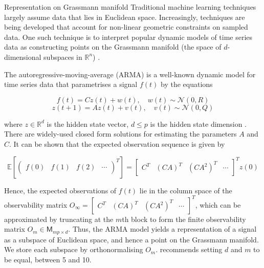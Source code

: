 \documentclass[final]{beamer}
\newlength{\onecolwid}
\begin{document}
\begin{frame}[t]
\begin{columns}[t]
\begin{column}{\onecolwid} %


\begin{block}{Representation on Grassmann manifold}
    Traditional machine learning techniques largely assume data that lies in Euclidean space.
    Increasingly, techniques are being developed that account for non-linear geometric constraints
    on sampled data. One such technique is to interpret popular dynamic models of time series data
    as constructing points on the Grassmann manifold (the space of $d$-dimensional subspaces in
    $\mathbb{R}^n$) \cite{turaga_statistical_2011}.

    The autoregressive-moving-average (ARMA) is a well-known dynamic model for time series data that
    parametrises a signal $f(t)$ by the equations

    \begin{equation}
        f(t) = Cz(t) + w(t), \quad w(t) \sim \mathcal{N}(0, R)
    \end{equation}
    \begin{equation}
        z(t + 1) = Az(t) + v(t), \quad v(t) \sim \mathcal{N}(0, Q)
    \end{equation}

    where $z \in \mathbb{R}^d$ is the hidden state vector, $d \leq p$ is the hidden state dimension
    \cite{turaga_statistical_2011}. There are widely-used closed form solutions for estimating the
    parameters $A$ and $C$. It can be shown that the expected observation sequence is given by

    \begin{equation}\label{eq:observation}
        \mathbb{E}[\begin{pmatrix} f(0) & f(1) & f(2) & \cdots \end{pmatrix}^T]
            = \begin{bmatrix} C^T & (CA)^T & (CA^2)^T & \cdots \end{bmatrix}^T z(0)
    \end{equation}

    Hence, the expected observations of $f(t)$ lie in the column space of the observability matrix
    $O_\infty = \begin{bmatrix} C^T & (CA)^T & (CA^2)^T & \cdots \end{bmatrix}^T$, which can be
    approximated by truncating at the $m$th block to form the finite observability matrix $O_m \in
    \mathsf{M}_{mp \times d}$.  Thus, the ARMA model yields a representation of a signal as a
    subspace of Euclidean space, and hence a point on the Grassmann manifold. We store each subspace
    by orthonormalising $O_m$. \cite{turaga_statistical_2011} recommends setting $d$ and $m$ to be
    equal, between 5 and 10.
\end{block}


\end{column}
\end{columns}
\end{frame}
\end{document}
